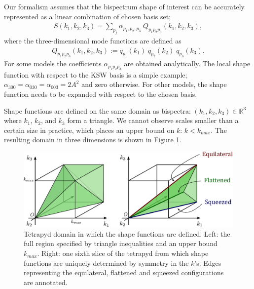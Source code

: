 Our formalism assumes that the bispectrum shape of interest can be accurately represented as a linear combination of chosen basis set; 
\begin{align}
	S(k_1,k_2,k_3) = \sum_{p_j} \alpha_{p_1,p_2,p_3} \; Q_{p_1 p_2 p_3}(k_1, k_2, k_3),
\end{align}
where the three-dimensional mode functions are defined as
\begin{align}
	Q_{p_1 p_2 p_3} (k_1, k_2, k_3) := q_{p_1}(k_1) \; q_{p_2}(k_2) \; q_{p_3}(k_3).
\end{align}
For some models the coefficients $\alpha_{p_1 p_2 p_3}$ are obtained analytically. The local shape function with respect to the KSW basis is a simple example; $\alpha_{300}=\alpha_{030}=\alpha_{003}=2A^2$ and zero otherwise. For other models, the shape function needs to be expanded with respect to the chosen basis. 

Shape functions are defined on the same domain as bispectra: $(k_1,k_2,k_3) \in \mathbb{R}^3$ where $k_1$, $k_2$, and $k_3$ form a triangle. We cannot observe scales smaller than a certain size in practice, which places an upper bound on $k$: $k < k_{max}$. The resulting domain in three dimensions is shown in Figure \ref{fig:tetrapyd}.

\begin{figure}[htbp!] 
	\centering    
	\hspace{10pt}
	\includegraphics[width=1.0\textwidth]{tetrapyd.pdf}
	\caption{Tetrapyd domain in which the shape functions are defined. Left: the full region specified by triangle inequalities and an upper bound $k_{max}$. Right: one sixth slice of the tetrapyd from which shape functions are uniquely determined by symmetry in the $k$'s. Edges representing the equilateral, flattened and squeezed configurations are annotated.}
	\label{fig:tetrapyd}
\end{figure}

